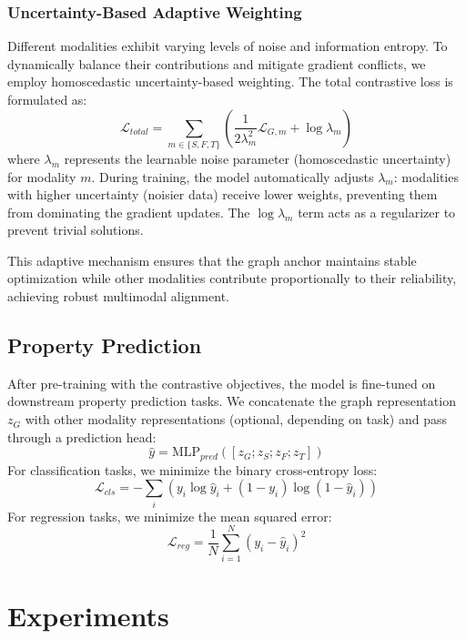\documentclass[journal]{IEEEtran}
\begin{document}
\subsubsection{Uncertainty-Based Adaptive Weighting}
Different modalities exhibit varying levels of noise and information entropy. To dynamically balance their contributions and mitigate gradient conflicts, we employ homoscedastic uncertainty-based weighting. The total contrastive loss is formulated as:
\begin{equation}
\mathcal{L}_{total} = \sum_{m \in \{S,F,T\}} \left( \frac{1}{2\lambda_m^2} \mathcal{L}_{G,m} + \log \lambda_m \right)
\end{equation}
where $\lambda_m$ represents the learnable noise parameter (homoscedastic uncertainty) for modality $m$. During training, the model automatically adjusts $\lambda_m$: modalities with higher uncertainty (noisier data) receive lower weights, preventing them from dominating the gradient updates. The $\log \lambda_m$ term acts as a regularizer to prevent trivial solutions.

This adaptive mechanism ensures that the graph anchor maintains stable optimization while other modalities contribute proportionally to their reliability, achieving robust multimodal alignment.

\subsection{Property Prediction}
After pre-training with the contrastive objectives, the model is fine-tuned on downstream property prediction tasks. We concatenate the graph representation $z_G$ with other modality representations (optional, depending on task) and pass through a prediction head:
\begin{equation}
\hat{y} = \text{MLP}_{pred}([z_G; z_S; z_F; z_T])
\end{equation}
For classification tasks, we minimize the binary cross-entropy loss:
\begin{equation}
\mathcal{L}_{cls} = -\sum_{i} \left( y_i \log \hat{y}_i + (1-y_i) \log (1-\hat{y}_i) \right)
\end{equation}
For regression tasks, we minimize the mean squared error:
\begin{equation}
\mathcal{L}_{reg} = \frac{1}{N} \sum_{i=1}^{N} (y_i - \hat{y}_i)^2
\end{equation}

\section{Experiments}
\label{sec:exp}
\end{document}
